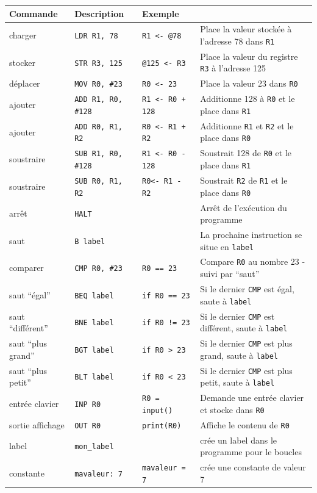 \renewcommand{\arraystretch}{1.21}
\begin{longtable}{|l|l|l|l|}
    \hline
    \textbf{Commande}  & \textbf{Description}  & \textbf{Exemple}  & \\    \hline
    \endfirsthead  \hline
    \endfoot  \hline
    charger   & \texttt{LDR R1, 78} & \texttt{R1 <- @78} & Place la valeur stockée à l'adresse 78 dans \texttt{R1}\\
    stocker   & \texttt{STR R3, 125} & \texttt{@125 <- R3} & Place la valeur du registre \texttt{R3} à l'adresse 125 \\
    déplacer  & \texttt{MOV R0, \#23} & \texttt{R0 <- 23} & Place la valeur 23 dans \texttt{R0} \\ \hline
    ajouter   & \texttt{ADD R1, R0, \#128} &\texttt{R1 <- R0 + 128}& Additionne 128 à \texttt{R0} et le place dans \texttt{R1} \\
    ajouter   & \texttt{ADD R0, R1, R2} & \texttt{R0 <- R1 + R2} & Additionne \texttt{R1} et \texttt{R2} et le place dans \texttt{R0} \\ 
    soustraire & \texttt{SUB R1, R0, \#128} & \texttt{R1 <- R0 - 128} & Soustrait 128 de \texttt{R0} et le place dans \texttt{R1} \\
    soustraire & \texttt{SUB R0, R1, R2} & \texttt{R0<- R1 - R2} & Soustrait \texttt{R2} de \texttt{R1} et le place dans \texttt{R0} \\ \hline
    arrêt & \texttt{HALT} & &Arrêt de l'exécution du programme \\
    saut  & \texttt{B label} &  & La prochaine instruction se situe en \texttt{label}\\
    comparer & \texttt{CMP R0, \#23} & \texttt{R0 == 23} & Compare \texttt{R0} au nombre 23 - suivi par ``saut''\\
    saut ``égal'' & \texttt{BEQ label} & \texttt{if R0 == 23}& Si le dernier \verb+CMP+ est égal, saute à \texttt{label}\\
    saut ``différent'' & \texttt{BNE label} & \texttt{if R0 != 23}& Si le dernier \texttt{CMP} est différent, saute à \texttt{label}\\
    saut ``plus grand'' & \texttt{BGT label} & \texttt{if R0 > 23}& Si le dernier \texttt{CMP} est plus grand, saute à \texttt{label}\\
    saut ``plus petit'' & \texttt{BLT label} & \texttt{if R0 < 23}& Si le dernier \texttt{CMP} est plus petit, saute à \texttt{label}\\
	\hline
	entrée clavier & \texttt{INP R0} & \texttt{R0 = input()} & Demande une entrée clavier et stocke dans \texttt{R0} \\
	sortie affichage & \texttt{OUT R0} & \texttt{print(R0)} & Affiche le contenu de \texttt{R0} \\
	\hline
	label & \texttt{mon\_label} & & crée un label dans le programme pour le boucles \\
	constante & \texttt{mavaleur: 7} & \texttt{mavaleur = 7} & crée une constante de valeur 7\\ \hline
\end{longtable}


